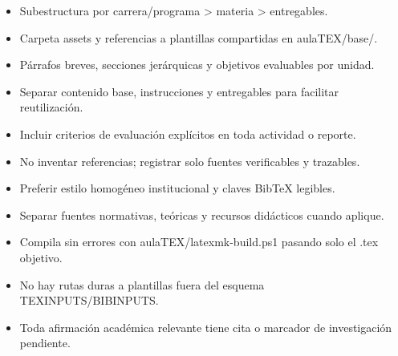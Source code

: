 \documentclass[12pt]{article}
\begin{document}
\begin{itemize}[leftmargin=*]
  \item Subestructura por carrera/programa > materia > entregables.
  \item Carpeta assets y referencias a plantillas compartidas en aulaTEX/base/.
  \item Párrafos breves, secciones jerárquicas y objetivos evaluables por unidad.
  \item Separar contenido base, instrucciones y entregables para facilitar reutilización.
  \item Incluir criterios de evaluación explícitos en toda actividad o reporte.
  \item No inventar referencias; registrar solo fuentes verificables y trazables.
  \item Preferir estilo homogéneo institucional y claves BibTeX legibles.
  \item Separar fuentes normativas, teóricas y recursos didácticos cuando aplique.
  \item Compila sin errores con aulaTEX/latexmk-build.ps1 pasando solo el .tex objetivo.
  \item No hay rutas duras a plantillas fuera del esquema TEXINPUTS/BIBINPUTS.
  \item Toda afirmación académica relevante tiene cita o marcador de investigación pendiente.
\end{itemize}
\end{document}
